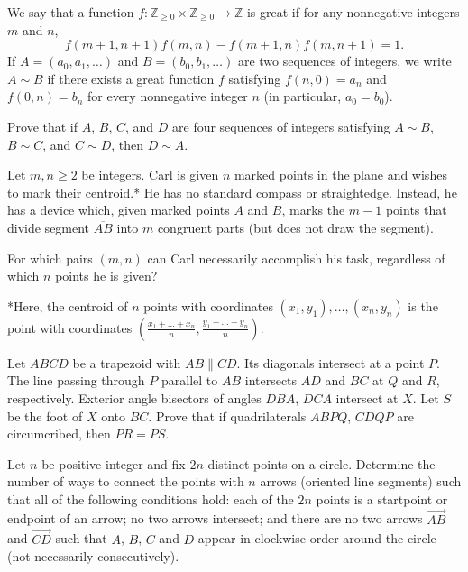\documentclass[11pt]{scrartcl}
\begin{document}
\begin{problem}[2667130530962382147]
	We say that a function $f: \mathbb{Z}_{\ge 0} \times \mathbb{Z}_{\ge 0} \to \mathbb{Z}$ is great if for any nonnegative integers $m$ and $n$,
\[f(m + 1, n + 1) f(m, n) - f(m + 1, n) f(m, n + 1) = 1.\]If $A = (a_0, a_1, \dots)$ and $B = (b_0, b_1, \dots)$ are two sequences of integers, we write $A \sim B$ if there exists a great function $f$ satisfying $f(n, 0) = a_n$ and $f(0, n) = b_n$ for every nonnegative integer $n$ (in particular, $a_0 = b_0$).

Prove that if $A$, $B$, $C$, and $D$ are four sequences of integers satisfying $A \sim B$, $B \sim C$, and $C \sim D$, then $D \sim A$.
\end{problem}
\begin{problem}[744695293387960]
Let $m, n \ge 2$ be integers. Carl is given $n$ marked points in the plane and wishes to mark their centroid.* He has no standard compass or straightedge. Instead, he has a device which, given marked points $A$ and $B$, marks the $m-1$ points that divide segment $\overline{AB}$ into $m$ congruent parts (but does not draw the segment).

For which pairs $(m,n)$ can Carl necessarily accomplish his task, regardless of which $n$ points he is given?

*Here, the centroid of $n$ points with coordinates $(x_1, y_1), \dots, (x_n, y_n)$ is the point with coordinates $\left( \frac{x_1 + \dots + x_n}{n}, \frac{y_1 + \dots + y_n}{n}\right)$.
\end{problem}
\begin{problem}[8840567523125912282]
	Let $ABCD$ be a trapezoid with $AB\parallel CD$. Its diagonals intersect at a point $P$. The line passing through $P$ parallel to $AB$ intersects $AD$ and $BC$ at $Q$ and $R$, respectively. Exterior angle bisectors of angles $DBA$, $DCA$ intersect at $X$. Let $S$ be the foot of $X$ onto $BC$. Prove that if quadrilaterals $ABPQ$, $CDQP$ are circumcribed, then $PR=PS$.
\end{problem}
\begin{problem}[8156079118189111754]
	Let $n$ be positive integer and fix $2n$ distinct points on a circle. Determine the number of ways to connect the points with $n$ arrows (oriented line segments) such that all of the following conditions hold:
each of the $2n$ points is a startpoint or endpoint of an arrow;
no two arrows intersect; and
there are no two arrows $\overrightarrow{AB}$ and $\overrightarrow{CD}$ such that $A$, $B$, $C$ and $D$ appear in clockwise order around the circle (not necessarily consecutively).
\end{problem}
\end{document}
